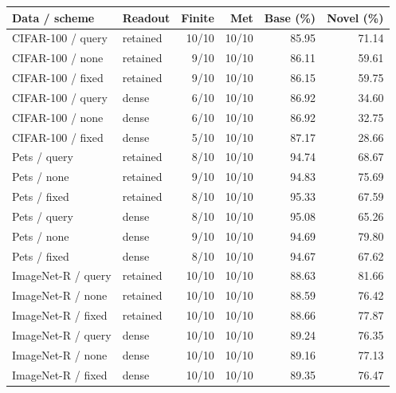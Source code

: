 \begin{tabular}{@{}llrrrr@{}}
\toprule
Data / scheme & Readout & Finite & Met & Base (\%) & Novel (\%) \\
\midrule
CIFAR-100 / query & retained & 10/10 & 10/10 & 85.95 & 71.14 \\
CIFAR-100 / none & retained & 9/10 & 10/10 & 86.11 & 59.61 \\
CIFAR-100 / fixed & retained & 9/10 & 10/10 & 86.15 & 59.75 \\
CIFAR-100 / query & dense & 6/10 & 10/10 & 86.92 & 34.60 \\
CIFAR-100 / none & dense & 6/10 & 10/10 & 86.92 & 32.75 \\
CIFAR-100 / fixed & dense & 5/10 & 10/10 & 87.17 & 28.66 \\
\midrule
Pets / query & retained & 8/10 & 10/10 & 94.74 & 68.67 \\
Pets / none & retained & 9/10 & 10/10 & 94.83 & 75.69 \\
Pets / fixed & retained & 8/10 & 10/10 & 95.33 & 67.59 \\
Pets / query & dense & 8/10 & 10/10 & 95.08 & 65.26 \\
Pets / none & dense & 9/10 & 10/10 & 94.69 & 79.80 \\
Pets / fixed & dense & 8/10 & 10/10 & 94.67 & 67.62 \\
\midrule
ImageNet-R / query & retained & 10/10 & 10/10 & 88.63 & 81.66 \\
ImageNet-R / none & retained & 10/10 & 10/10 & 88.59 & 76.42 \\
ImageNet-R / fixed & retained & 10/10 & 10/10 & 88.66 & 77.87 \\
ImageNet-R / query & dense & 10/10 & 10/10 & 89.24 & 76.35 \\
ImageNet-R / none & dense & 10/10 & 10/10 & 89.16 & 77.13 \\
ImageNet-R / fixed & dense & 10/10 & 10/10 & 89.35 & 76.47 \\
\bottomrule
\end{tabular}
